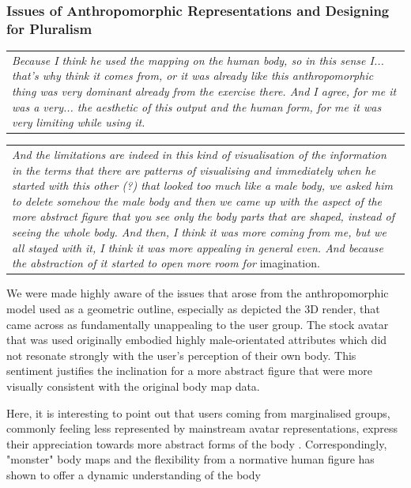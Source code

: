 \subsubsection{Issues of Anthropomorphic Representations and Designing for Pluralism}

\begin{center}
\begin{tabular}{ p{13cm}} 
\textit{Because I think he used the mapping on the human body, so in this sense I... that's why  think it comes from, or it was already like this anthropomorphic thing was very dominant already from the exercise there. And I agree, for me it was a very... the aesthetic of this output and the human form, for me it was very limiting while using it.}
\end{tabular}
\end{center}

\begin{center}
\begin{tabular}{ p{13cm}} 
\textit{And the limitations are indeed in this kind of visualisation of the information in the terms that there are patterns of visualising and immediately when he started with this other (?) that looked too much like a male body, we asked him to delete somehow the male body and then we came up with the aspect of the more abstract figure that you see only the body parts that are shaped, instead of seeing the whole body. And then, I think it was more coming from me, but we all stayed with it, I think it was more appealing in general even. And because the abstraction of it started to open more room for} imagination.
\end{tabular}
\end{center}

We were made highly aware of the issues that arose from the anthropomorphic model used as a geometric outline, especially as depicted the 3D render, that came across as fundamentally unappealing to the user group. The stock avatar that was used originally embodied highly male-orientated attributes which did not resonate strongly with the user's perception of their own body. This sentiment justifies the inclination for a more abstract figure that were more visually consistent with the original body map data. 

Here, it is interesting to point out that users coming from marginalised groups, commonly feeling less represented by mainstream avatar representations, express their appreciation towards more abstract forms of the body \cite{niehaus_making_2021}. Correspondingly, "monster" body maps and the flexibility from a normative human figure has shown to offer a dynamic understanding of the body \cite{hook_soma_2019} 

